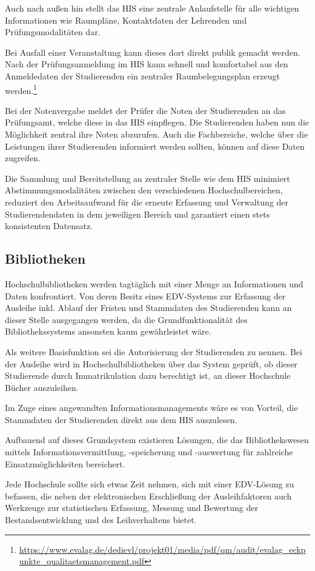 Auch nach außen hin stellt das HIS eine zentrale Anlaufstelle für alle wichtigen Informationen wie Raumpläne, Kontaktdaten der Lehrenden und Prüfungsmodalitäten dar. 

Bei Ausfall einer Veranstaltung kann dieses dort direkt publik gemacht werden. Nach der Prüfungsanmeldung im HIS kann schnell und komfortabel aus den Anmeldedaten der Studierenden ein zentraler Raumbelegungsplan erzeugt werden.\footnote{\url{https://www.evalag.de/dedievl/projekt01/media/pdf/qm/audit/evalag_eckpunkte_qualitaetsmanagement.pdf}}

Bei der Notenvergabe meldet der Prüfer die Noten der Studierenden an das Prüfungsamt, welche diese in das HIS einpflegen. 
Die Studierenden haben nun die Möglichkeit zentral ihre Noten abzurufen. Auch die Fachbereiche, welche über die Leistungen ihrer Studierenden informiert werden sollten, können auf diese Daten zugreifen. 

Die Sammlung und Bereitstellung an zentraler Stelle wie dem HIS minimiert Abstimmungsmodalitäten zwischen den verschiedenen Hochschulbereichen, reduziert den Arbeitsaufwand für die erneute Erfassung und Verwaltung der Studierendendaten in dem jeweiligen Bereich und garantiert einen stets konsistenten Datensatz.

\subsection{Bibliotheken}
Hochschulbibliotheken werden tagtäglich mit einer Menge an Informationen und Daten konfrontiert. 
Von deren Besitz eines EDV-Systems zur Erfassung der Ausleihe inkl. Ablauf der Fristen und Stammdaten des Studierenden kann an dieser Stelle ausgegangen werden, da die Grundfunktionalität des Bibliothekssystems ansonsten kaum gewährleistet wäre.

Als weitere Basisfunktion sei die Autorisierung der Studierenden zu nennen. Bei der Ausleihe wird in Hochschulbibliotheken über das System geprüft, ob dieser Studierende durch Immatrikulation dazu berechtigt ist, an dieser Hochschule Bücher auszuleihen.

Im Zuge eines angewandten Informationsmanagements wäre es von Vorteil, die Stammdaten der Studierenden direkt aus dem HIS auszulesen. 

Aufbauend auf dieses Grundsystem existieren Lösungen, die das Bibliothekswesen mittels Informationsvermittlung, -speicherung und -auswertung für zahlreiche Einsatzmöglichkeiten bereichert.
 
Jede Hochschule sollte sich etwas Zeit nehmen, sich mit einer EDV-Lösung zu befassen, die neben der elektronischen Erschließung der Ausleihfaktoren auch Werkzeuge zur statistischen Erfassung, Messung und Bewertung der Bestandsentwicklung und des Leihverhaltens bietet.

